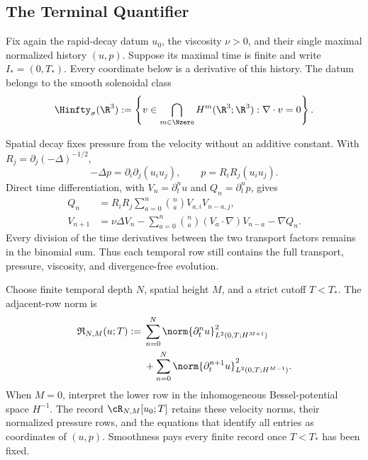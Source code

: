 \subsection{The Terminal Quantifier}\label{sub:TheTerminalQuantifier}

Fix again the rapid-decay datum \(u_0\), the viscosity \(\nu>0\), and their
single maximal normalized history \((u,p)\).  Suppose its maximal time is
finite and write \(I_*=(0,T_*)\).  Every coordinate below is a derivative of
this history.  The datum belongs to the smooth solenoidal class
\begin{equation}\label{eq:SectionThreeSmoothSolenoidalClass}
  \Hinfty_\sigma(\R^3)
  :=
  \left\{
    v\in\bigcap_{m\in\Nzero}H^m(\R^3;\R^3)
    :\nabla\cdot v=0
  \right\}.
\end{equation}

Spatial decay fixes pressure from the velocity without an additive constant.
With \(R_j=\partial_j(-\Delta)^{-1/2}\),
\begin{equation}\label{eq:SectionThreePressureNormalization}
  -\Delta p=\partial_i\partial_j(u_i u_j),
  \qquad
  p=R_iR_j(u_i u_j).
\end{equation}
Direct time differentiation, with \(V_n=\partial_t^nu\) and
\(Q_n=\partial_t^np\), gives
\begin{align}
  Q_n
  &=R_iR_j\sum_{a=0}^{n}\binom{n}{a}V_{a,i}V_{n-a,j},
  \label{eq:SectionThreePressureRecurrence}\\
  V_{n+1}
  &=\nu\Delta V_n
  -\sum_{a=0}^{n}\binom{n}{a}(V_a\cdot\nabla)V_{n-a}
  -\nabla Q_n.
  \label{eq:SectionThreeVelocityRecurrence}
\end{align}
Every division of the time derivatives between the two transport factors remains
in the binomial sum.  Thus each temporal row still contains the full transport,
pressure, viscosity, and divergence-free evolution.

Choose finite temporal depth \(N\), spatial height \(M\), and a strict cutoff
\(T<T_*\).  The adjacent-row norm is
\begin{equation}\label{eq:SectionThreeRectangleNorm}
\begin{aligned}
  \mathfrak R_{N,M}(u;T)
  :={}&
  \sum_{n=0}^{N}
  \norm{\partial_t^n u}_{L^2(0,T;H^{M+1})}^{2}
  \\
  &+
  \sum_{n=0}^{N}
  \norm{\partial_t^{n+1}u}_{L^2(0,T;H^{M-1})}^{2}.
\end{aligned}
\end{equation}
When \(M=0\), interpret the lower row in the inhomogeneous Bessel-potential
space \(H^{-1}\).  The record \(\cR_{N,M}[u_0;T]\) retains these velocity norms,
their normalized pressure rows, and the equations that identify all entries as
coordinates of \((u,p)\).  Smoothness pays every finite record once \(T<T_*\)
has been fixed.

